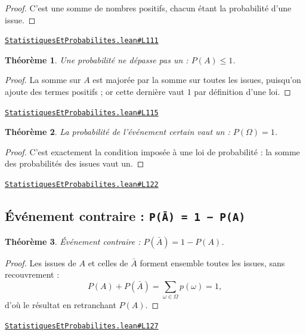 \documentclass[11pt,a4paper]{article}
\theoremstyle{definition}
\theoremstyle{plain}
\newtheorem{theoreme}{Théorème}
\newcommand{\source}[2]{\par\smallskip\noindent\hfill{\footnotesize\href{#1}{\texttt{#2}}}\par\smallskip}
\begin{document}
\begin{proof}
C'est une somme de nombres positifs, chacun étant la probabilité d'une issue.
\end{proof}
\source{https://github.com/Commutator-IO/learn-lean/blob/main/cours/01-college/06-statistiques-et-probabilites/StatistiquesEtProbabilites.lean\#L111}{StatistiquesEtProbabilites.lean\#L111}

\begin{theoreme}
Une probabilité ne dépasse pas un : $P(A) \le 1$.
\end{theoreme}

\begin{proof}
La somme sur $A$ est majorée par la somme sur toutes les issues, puisqu'on ajoute des
termes positifs ; or cette dernière vaut $1$ par définition d'une loi.
\end{proof}
\source{https://github.com/Commutator-IO/learn-lean/blob/main/cours/01-college/06-statistiques-et-probabilites/StatistiquesEtProbabilites.lean\#L115}{StatistiquesEtProbabilites.lean\#L115}

\begin{theoreme}
La probabilité de l'événement certain vaut un : $P(\Omega) = 1$.
\end{theoreme}

\begin{proof}
C'est exactement la condition imposée à une loi de probabilité : la somme des
probabilités des issues vaut un.
\end{proof}
\source{https://github.com/Commutator-IO/learn-lean/blob/main/cours/01-college/06-statistiques-et-probabilites/StatistiquesEtProbabilites.lean\#L122}{StatistiquesEtProbabilites.lean\#L122}

\subsection{Événement contraire : \texttt{P(Ā) = 1 − P(A)}}

\begin{theoreme}
Événement contraire : $P(\bar{A}) = 1 - P(A)$.
\end{theoreme}

\begin{proof}
Les issues de $A$ et celles de $\bar{A}$ forment ensemble toutes les issues, sans
recouvrement :
\[ P(A) + P(\bar{A}) = \sum_{\omega \in \Omega} p(\omega) = 1 , \]
d'où le résultat en retranchant $P(A)$.
\end{proof}
\source{https://github.com/Commutator-IO/learn-lean/blob/main/cours/01-college/06-statistiques-et-probabilites/StatistiquesEtProbabilites.lean\#L127}{StatistiquesEtProbabilites.lean\#L127}
\end{document}
